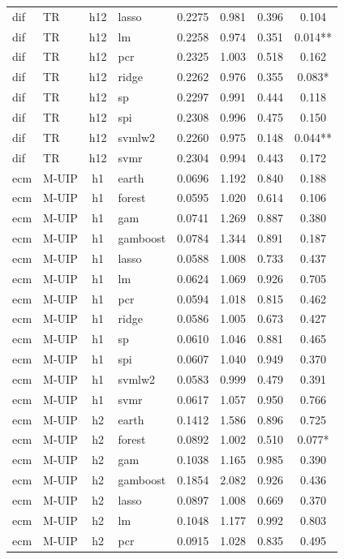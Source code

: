 \begin{ThreePartTable}
\begin{longtable}[t]{llclcccc}
dif & TR & h12 & lasso & 0.2275 & 0.981 & 0.396 & 0.104\\
dif & TR & h12 & lm & 0.2258 & 0.974 & 0.351 & 0.014**\\
dif & TR & h12 & pcr & 0.2325 & 1.003 & 0.518 & 0.162\\
dif & TR & h12 & ridge & 0.2262 & 0.976 & 0.355 & 0.083*\\
dif & TR & h12 & sp & 0.2297 & 0.991 & 0.444 & 0.118\\
dif & TR & h12 & spi & 0.2308 & 0.996 & 0.475 & 0.150\\
dif & TR & h12 & svmlw2 & 0.2260 & 0.975 & 0.148 & 0.044**\\
dif & TR & h12 & svmr & 0.2304 & 0.994 & 0.443 & 0.172\\
\addlinespace
ecm & M-UIP & h1 & earth & 0.0696 & 1.192 & 0.840 & 0.188\\
ecm & M-UIP & h1 & forest & 0.0595 & 1.020 & 0.614 & 0.106\\
ecm & M-UIP & h1 & gam & 0.0741 & 1.269 & 0.887 & 0.380\\
ecm & M-UIP & h1 & gamboost & 0.0784 & 1.344 & 0.891 & 0.187\\
ecm & M-UIP & h1 & lasso & 0.0588 & 1.008 & 0.733 & 0.437\\
ecm & M-UIP & h1 & lm & 0.0624 & 1.069 & 0.926 & 0.705\\
ecm & M-UIP & h1 & pcr & 0.0594 & 1.018 & 0.815 & 0.462\\
ecm & M-UIP & h1 & ridge & 0.0586 & 1.005 & 0.673 & 0.427\\
ecm & M-UIP & h1 & sp & 0.0610 & 1.046 & 0.881 & 0.465\\
ecm & M-UIP & h1 & spi & 0.0607 & 1.040 & 0.949 & 0.370\\
ecm & M-UIP & h1 & svmlw2 & 0.0583 & 0.999 & 0.479 & 0.391\\
ecm & M-UIP & h1 & svmr & 0.0617 & 1.057 & 0.950 & 0.766\\
\addlinespace
ecm & M-UIP & h2 & earth & 0.1412 & 1.586 & 0.896 & 0.725\\
ecm & M-UIP & h2 & forest & 0.0892 & 1.002 & 0.510 & 0.077*\\
ecm & M-UIP & h2 & gam & 0.1038 & 1.165 & 0.985 & 0.390\\
ecm & M-UIP & h2 & gamboost & 0.1854 & 2.082 & 0.926 & 0.436\\
ecm & M-UIP & h2 & lasso & 0.0897 & 1.008 & 0.669 & 0.370\\
ecm & M-UIP & h2 & lm & 0.1048 & 1.177 & 0.992 & 0.803\\
ecm & M-UIP & h2 & pcr & 0.0915 & 1.028 & 0.835 & 0.495\\

\end{longtable}
\end{ThreePartTable}
